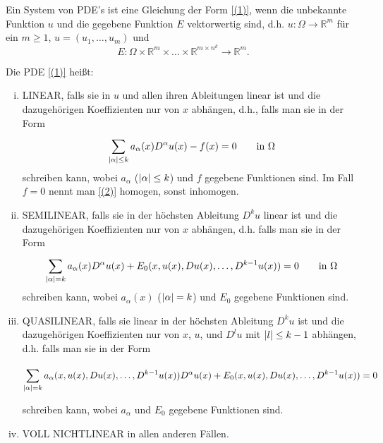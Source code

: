 \begin{definition}
	Ein System von PDE's ist eine Gleichung der Form \eqref{(1)}, wenn die unbekannte Funktion $u$ und die gegebene Funktion $E$ vektorwertig sind, d.h. $u: \Omega \to \mathbb{R}^m$ für ein $m \geq 1$, $u = (u_1, \dots, u_m)$ und
	\[
		E: \Omega \times \mathbb{R}^m \times \dots \times \mathbb{R}^{m \times n^k} \to \mathbb{R}^m.
	\]
\end{definition}
\begin{definition}
		Die PDE \eqref{(1)} heißt:
		\begin{enumerate}[(i)]
			\item LINEAR, falls sie in $u$ und allen ihren Ableitungen linear ist und die dazugehörigen Koeffizienten nur von $x$ abhängen,
			d.h., falls man sie in der Form
			\begin{equation}
				\sum_{\lvert\alpha\rvert\leq k}^{}a_{\alpha}(x) D^{\alpha}u(x) - f(x) = 0 \qquad \text{in } \Omega \label{(2)}
			\end{equation} 
			schreiben kann, wobei $a_{\alpha}$ ($\lvert\alpha\rvert\leq k$) und $f$ gegebene Funktionen sind.
			Im Fall $f=0$ nennt man \eqref{(2)} homogen, sonst inhomogen.
			\item SEMILINEAR, falls sie in der höchsten Ableitung $D^ku$ linear ist und die dazugehörigen Koeffizienten nur von $x$ abhängen,
			d.h. falls man sie in der Form
			\begin{equation}
				\sum_{\lvert\alpha\rvert=k}^{}a_{\alpha}(x)D^{\alpha}u(x) + E_0(x,u(x),Du(x),\dots,D^{k-1}u(x))=0 \qquad \text{in }\Omega
			\end{equation}
			schreiben kann, wobei $a_{\alpha}(x)$ ($\lvert\alpha\rvert=k$) und $E_0$ gegebene Funktionen sind.
			\item QUASILINEAR, falls sie linear in der höchsten Ableitung $D^ku$ ist und die dazugehörigen Koeffizienten nur von $x$, $u$, 
			und $D^lu$ mit $\lvert l\rvert\leq k-1$ abhängen, d.h. falls man sie in der Form
			\begin{small}
			\begin{equation}
				\sum_{\lvert\alpha\rvert=k}^{}a_{\alpha}(x,u(x),Du(x),\dots,D^{k-1}u(x))D^{\alpha}u(x) + E_0(x,u(x),Du(x),\dots,D^{k-1}u(x)) = 0
			\end{equation}
			\end{small}
			schreiben kann, wobei $a_{\alpha}$ und $E_0$ gegebene Funktionen sind.
			\item VOLL NICHTLINEAR in allen anderen Fällen.
			
		\end{enumerate}
\end{definition}

